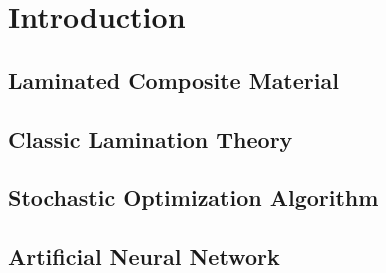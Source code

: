 
\chapter{Introduction} %

\label{Chapter1} %


\section{Laminated Composite Material}

\section{Classic Lamination Theory}

\section{Stochastic Optimization Algorithm}

\section{Artificial Neural Network}


